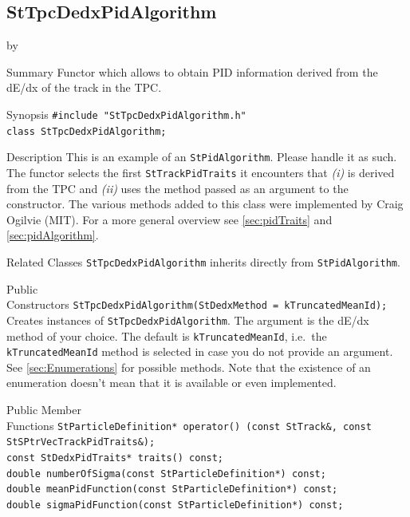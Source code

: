 \documentclass[twoside]{article}
\newcommand{\entrylabel}[1]{\mbox{\textbf{{#1}}}\hfil}%
\newenvironment{entry}
{\begin{list}{}%
    {\renewcommand{\makelabel}{\entrylabel}%
     \setlength{\labelwidth}{90pt}%
     \setlength{\leftmargin}{\labelwidth}
     \advance\leftmargin by \labelsep%
      }%
    }%
  {\end{list}}
\newcommand{\Entrylabel}[1]%
{\raisebox{0pt}[1ex][0pt]{\makebox[\labelwidth][l]%
    {\parbox[t]{\labelwidth}{\hspace{0pt}\textbf{{#1}}}}}}
\newenvironment{Entry}%
{\renewcommand{\entrylabel}{\Entrylabel}\begin{entry}}%
  {\end{entry}}
\begin{document}
\subsection{StTpcDedxPidAlgorithm}
\label{sec:StTpcDedxPidAlgorithm}
\begin{Entry}
\item[Summary] Functor which allows to obtain PID information
    derived from the dE/dx of the track in the TPC.
\item[Synopsis]
    \verb+#include "StTpcDedxPidAlgorithm.h"+\\
    \verb+class StTpcDedxPidAlgorithm;+\\
    
\item[Description] This is an example of an \texttt{StPidAlgorithm}.
    Please handle it as such.  The functor selects the first
    \texttt{StTrackPidTraits} it encounters that \textit{(i)} is
    derived from the TPC and \textit{(ii)} uses the method passed as
    an argument to the constructor. The various methods added to this
    class were implemented by Craig Ogilvie (MIT).  For a more general
    overview see \ref{sec:pidTraits} and \ref{sec:pidAlgorithm}.
    
\item[Related Classes]
    \texttt{StTpcDedxPidAlgorithm} inherits directly from
    \texttt{StPidAlgorithm}.
    
\item[Public\\ Constructors]
    \verb+StTpcDedxPidAlgorithm(StDedxMethod = kTruncatedMeanId);+\\
    Creates instances of \texttt{StTpcDedxPidAlgorithm}. The argument
    is the dE/dx method of your choice. The default is
    \texttt{kTruncatedMeanId}, i.e.~the \texttt{kTruncatedMeanId}
    method is selected in case you do not provide an argument.  See
    \ref{sec:Enumerations} for possible methods. Note that the
    existence of an enumeration doesn't mean that it is available or
    even implemented.
    
\item[Public Member\\ Functions]
    \verb+StParticleDefinition* operator() (const StTrack&, const StSPtrVecTrackPidTraits&);+\\
    \verb+const StDedxPidTraits* traits() const;+\\
    \verb+double numberOfSigma(const StParticleDefinition*) const;+\\
    \verb+double meanPidFunction(const StParticleDefinition*) const;+\\
    \verb+double sigmaPidFunction(const StParticleDefinition*) const;+\\
\end{Entry}
\clearpage
\end{document}

